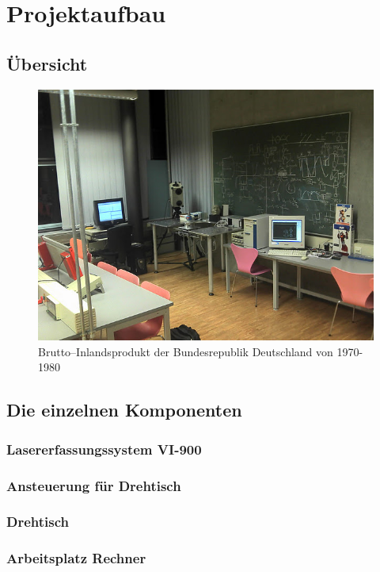 \documentclass[11pt]{article}
\begin{document}
\section{Projektaufbau}
\subsection{Übersicht}
\begin{figure}[hp]
	\centering
	\includegraphics[width=16cm]{Uebersicht.jpg}
	\caption{Brutto--Inlandsprodukt der Bundesrepublik Deutschland von 1970-1980}
\end{figure}
\subsection{Die einzelnen Komponenten}
\subsubsection{Lasererfassungssystem VI-900}
\subsubsection{Ansteuerung für Drehtisch}
\subsubsection{Drehtisch}
\subsubsection{Arbeitsplatz Rechner}
\newpage

\end{document}
